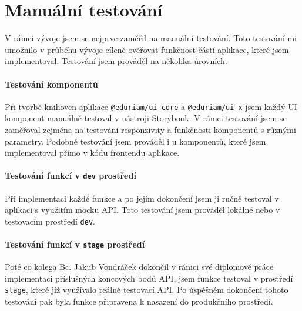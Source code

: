\section{Manuální testování}

V rámci vývoje jsem se nejprve zaměřil na manuální testování. Toto testování mi umožnilo v průběhu vývoje cíleně ověřovat funkčnost částí aplikace, které jsem implementoval. Testování jsem prováděl na několika úrovních.

\paragraph{Testování komponentů} Při tvorbě knihoven aplikace \texttt{@eduriam/ui-core} a \texttt{@eduriam/ui-x} jsem každý UI komponent manuálně testoval v nástroji Storybook. V rámci testování jsem se zaměřoval zejména na testování responzivity a funkčnosti komponentů s různými parametry. Podobné testování jsem prováděl i u komponentů, které jsem implementoval přímo v kódu frontendu aplikace.

\paragraph{Testování funkcí v \texttt{dev} prostředí} Při implementaci každé funkce a po jejím dokončení jsem ji ručně testoval v aplikaci s využitím mocku API. Toto testování jsem prováděl lokálně nebo v testovacím prostředí \texttt{dev}.

\paragraph{Testování funkcí v \texttt{stage} prostředí} Poté co kolega Bc. Jakub Vondráček dokončil v rámci své diplomové práce implementaci příslušných koncových bodů API, jsem funkce testoval v prostředí \texttt{stage}, které již využívalo reálné testovací API. Po úspěšném dokončení tohoto testování pak byla funkce připravena k nasazení do produkčního prostředí.
